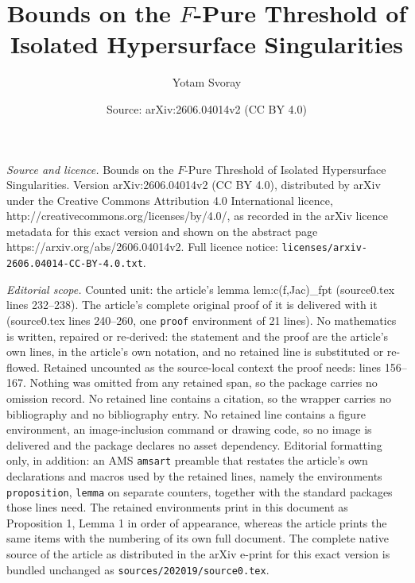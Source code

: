 \documentclass[10pt,a4paper]{amsart}
\title{Bounds on the $F$-Pure Threshold of Isolated Hypersurface Singularities}
\author{Yotam Svoray}
\date{Source: arXiv:2606.04014v2 (CC BY 4.0)}
\begin{document}
\maketitle

\noindent\emph{Source and licence.} Bounds on the $F$-Pure Threshold of Isolated Hypersurface Singularities. Version arXiv:2606.04014v2 (CC BY 4.0), distributed by arXiv under the Creative Commons Attribution 4.0 International licence, http://creativecommons.org/licenses/by/4.0/, as recorded in the arXiv licence metadata for this exact version and shown on the abstract page https://arxiv.org/abs/2606.04014v2. Full licence notice: \texttt{licenses/arxiv-2606.04014-CC-BY-4.0.txt}.\par\smallskip

\noindent\textit{Editorial scope.} Counted unit: the article's lemma lem:c(f,Jac)\_fpt (source0.tex lines 232--238). The article's complete original proof of it is delivered with it (source0.tex lines 240--260, one \texttt{proof} environment of 21 lines). No mathematics is written, repaired or re-derived: the statement and the proof are the article's own lines, in the article's own notation, and no retained line is substituted or re-flowed.  Retained uncounted as the source-local context the proof needs: lines 156--167.  Nothing was omitted from any retained span, so the package carries no omission record.  No retained line contains a citation, so the wrapper carries no bibliography and no bibliography entry.  No retained line contains a figure environment, an image-inclusion command or drawing code, so no image is delivered and the package declares no asset dependency.  Editorial formatting only, in addition: an AMS \texttt{amsart} preamble that restates the article's own declarations and macros used by the retained lines, namely the environments \texttt{proposition}, \texttt{lemma} on separate counters, together with the standard packages those lines need.  The retained environments print in this document as Proposition 1, Lemma 1 in order of appearance, whereas the article prints the same items with the numbering of its own full document.  The complete native source of the article as distributed in the arXiv e-print for this exact version is bundled unchanged as \texttt{sources/202019/source0.tex}.
\end{document}
